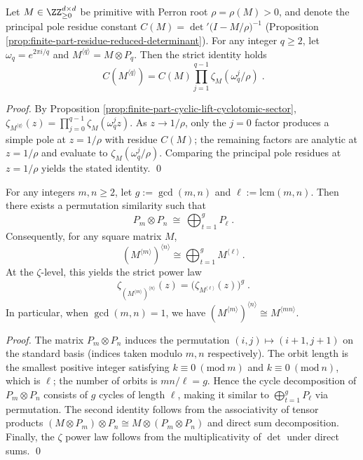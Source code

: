 \begin{proposition}\label{prop:finite-part-cyclic-lift-torsion-product}
Let \(M\in\ZZ_{\ge 0}^{d\times d}\) be primitive with Perron root \(\rho=\rho(M)>0\), and denote the principal pole residue constant
\(
C(M)=\det\nolimits'\!\bigl(I-M/\rho\bigr)^{-1}
\)
(Proposition \ref{prop:finite-part-residue-reduced-determinant}).
For any integer \(q\ge 2\), let \(\omega_q=e^{2\pi i/q}\) and \(M^{\langle q\rangle}=M\otimes P_q\).
Then the strict identity holds
\[
\boxed{\;
C(M^{\langle q\rangle})
=C(M)\prod_{j=1}^{q-1}\zeta_M(\omega_q^j/\rho)\; }.
\]
\end{proposition}
\begin{proof}
By Proposition \ref{prop:finite-part-cyclic-lift-cyclotomic-sector},
\(
\zeta_{M^{\langle q\rangle}}(z)=\prod_{j=0}^{q-1}\zeta_M(\omega_q^j z)
\).
As \(z\to 1/\rho\), only the \(j=0\) factor produces a simple pole at \(z=1/\rho\) with residue \(C(M)\);
the remaining factors are analytic at \(z=1/\rho\) and evaluate to \(\zeta_M(\omega_q^j/\rho)\).
Comparing the principal pole residues at \(z=1/\rho\) yields the stated identity. \qed
\end{proof}

\begin{proposition}\label{prop:finite-part-cyclic-lift-gcd-lcm}
For any integers \(m,n\ge 2\), let \(g:=\gcd(m,n)\) and \(\ell:=\mathrm{lcm}(m,n)\).
Then there exists a permutation similarity such that
\[
\boxed{\;
P_m\otimes P_n\ \cong\ \bigoplus_{t=1}^{g} P_{\ell}\; }.
\]
Consequently, for any square matrix \(M\),
\[
\boxed{\;
(M^{\langle m\rangle})^{\langle n\rangle}
\cong
\bigoplus_{t=1}^{g} M^{\langle \ell\rangle}\; }.
\]
At the \(\zeta\)-level, this yields the strict power law
\[
\boxed{\;
\zeta_{(M^{\langle m\rangle})^{\langle n\rangle}}(z)
=\bigl(\zeta_{M^{\langle \ell\rangle}}(z)\bigr)^{g}\; }.
\]
In particular, when \(\gcd(m,n)=1\), we have \((M^{\langle m\rangle})^{\langle n\rangle}\cong M^{\langle mn\rangle}\).
\end{proposition}
\begin{proof}
The matrix \(P_m\otimes P_n\) induces the permutation
\(
(i,j)\mapsto(i+1,j+1)
\)
on the standard basis (indices taken modulo \(m,n\) respectively). The orbit length is the smallest positive integer satisfying \(k\equiv 0\ (\mathrm{mod}\ m)\) and \(k\equiv 0\ (\mathrm{mod}\ n)\), which is \(\ell\);
the number of orbits is \(mn/\ell=g\).
Hence the cycle decomposition of \(P_m\otimes P_n\) consists of \(g\) cycles of length \(\ell\), making it similar to \(\bigoplus_{t=1}^{g}P_\ell\) via permutation.
The second identity follows from the associativity of tensor products
\(
(M\otimes P_m)\otimes P_n\cong M\otimes(P_m\otimes P_n)
\)
and direct sum decomposition.
Finally, the \(\zeta\) power law follows from the multiplicativity of \(\det\) under direct sums. \qed
\end{proof}

